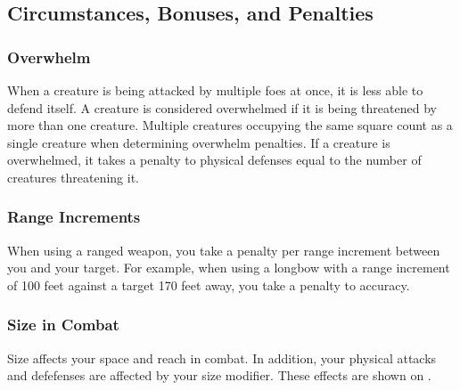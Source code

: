 \subsection{Circumstances, Bonuses, and Penalties}

\subsubsection{Overwhelm}\label{Overwhelm}
When a creature is being attacked by multiple foes at once, it is less able to defend itself.
A creature is considered overwhelmed if it is being threatened by more than one creature.
Multiple creatures occupying the same square count as a single creature when determining overwhelm penalties.
If a creature is overwhelmed, it takes a penalty to physical defenses equal to the number of creatures threatening it.

\subsubsection{Range Increments}
When using a ranged weapon, you take a  penalty per range increment between you and your target.
For example, when using a longbow with a range increment of 100 feet against a target 170 feet away, you take a  penalty to accuracy.

\subsubsection{Size in Combat}\label{Size in Combat}
Size affects your space and reach in combat.
In addition, your physical attacks and defefenses are affected by your size modifier.
These effects are shown on .

